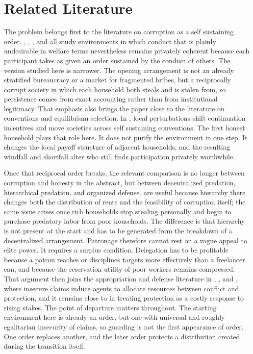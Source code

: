 \section{Related Literature}
\label{sec:literature}

The problem belongs first to the literature on corruption as a self sustaining order. \citet{andvig_moene_1990}, \citet{bardhan_1997}, \citet{shleifer_vishny_1993}, and \citet{tirole_1996} all study environments in which conduct that is plainly undesirable in welfare terms nevertheless remains privately coherent because each participant takes as given an order sustained by the conduct of others. The version studied here is narrower. The opening arrangement is not an already stratified bureaucracy or a market for fragmented bribes, but a reciprocally corrupt society in which each household both steals and is stolen from, so persistence comes from exact accounting rather than from institutional legitimacy. That emphasis also brings the paper close to the literature on conventions and equilibrium selection. In \citet{young_1993}, local perturbations shift continuation incentives and move societies across self sustaining conventions. The first honest household plays that role here. It does not purify the environment in one step. It changes the local payoff structure of adjacent households, and the resulting windfall and shortfall alter who still finds participation privately worthwhile.

Once that reciprocal order breaks, the relevant comparison is no longer between corruption and honesty in the abstract, but between decentralized predation, hierarchical predation, and organized defense. \citet{olsen_torsvik_1998} are useful because hierarchy there changes both the distribution of rents and the feasibility of corruption itself; the same issue arises once rich households stop stealing personally and begin to purchase predatory labor from poor households. The difference is that hierarchy is not present at the start and has to be generated from the breakdown of a decentralized arrangement. Patronage therefore cannot rest on a vague appeal to elite power. It requires a surplus condition. Delegation has to be profitable because a patron reaches or disciplines targets more effectively than a freelancer can, and because the reservation utility of poor workers remains compressed. That argument then joins the appropriation and defense literature in \citet{skaperdas_1992}, \citet{grossman_kim_1995}, and \citet{hirshleifer_1995}, where insecure claims induce agents to allocate resources between conflict and protection, and it remains close to \citet{demsetz_1967} in treating protection as a costly response to rising stakes. The point of departure matters throughout. The starting environment here is already an order, but one with universal and roughly egalitarian insecurity of claims, so guarding is not the first appearance of order. One order replaces another, and the later order protects a distribution created during the transition itself.

